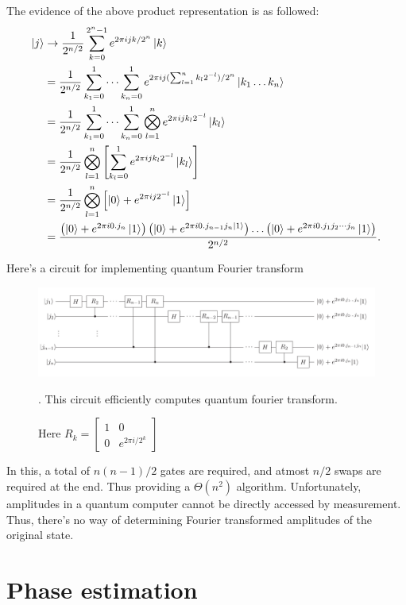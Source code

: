 The evidence of the above product representation is as followed:
\begin{align}
   \ket{j} &\rightarrow \frac{1}{2^{n/2}} \sum_{k=0}^{2^n-1} e^{2\pi i j k / 2^n} \ket{k} \\
    &= \frac{1}{2^{n/2}} \sum_{k_1=0}^1 \dots \sum_{k_n=0}^1 e^{2\pi i j (\sum_{l=1}^n k_l2^{-l}) / 2^n} \ket{k_1 \dots k_n} \\
    &= \frac{1}{2^{n/2}} \sum_{k_1=0}^1 \dots \sum_{k_n=0}^1 \bigotimes_{l=1}^n e^{2\pi i j k_l 2^{-l}} \ket{k_l} \\
    &= \frac{1}{2^{n/2}} \bigotimes_{l=1}^n \left[ \sum_{k_l=0}^1 e^{2\pi i j k_l 2^{-l}} \ket{k_l} \right]\\
    &= \frac{1}{2^{n/2}} \bigotimes_{l=1}^n \left[ \ket{0} + e^{2\pi i j 2^{-l}} \ket{1} \right] \\
    &= \frac{\left(\ket{0} + e^{2\pi i 0.j_n}\ket{1} \right)\left(\ket{0} + e^{2\pi i 0.j_{n-1}j_n\ket{1}}\right)\dots\left(\ket{0} + e^{2\pi i 0.j_1j_2\cdots j_n}\ket{1}\right)}{2^{n/2}}. 
\end{align}

Here's a circuit for implementing quantum Fourier transform
\begin{figure}[H]
    \centering
    \includegraphics[width=\linewidth]{images/quantumFourierCircuit.png}
    \caption{Here $R_k=\begin{bmatrix}
        1 & 0 \\ 0 & e^{2\pi i/2^k}
    \end{bmatrix}$}
    . This circuit efficiently computes quantum fourier transform.
    \label{fig:quantumFourierCircuit}
\end{figure}
In this, a total of $n(n-1)/2$ gates are required, and atmost $n/2$ swaps are required at the end. Thus providing a $\Theta(n^2)$ algorithm. Unfortunately,  amplitudes in a quantum computer cannot be directly accessed by measurement. Thus, there's no way of determining Fourier transformed amplitudes of the original state.

\section{Phase estimation}
